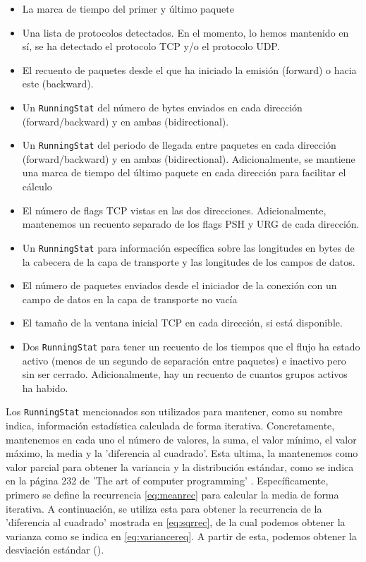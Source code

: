 \begin{itemize}
  \item La marca de tiempo del primer y último paquete
  \item Una lista de protocolos detectados. En el momento, lo hemos mantenido en sí, se ha detectado el protocolo TCP y/o el protocolo UDP.
  \item El recuento de paquetes desde el que ha iniciado la emisión (forward) o hacia este (backward).
  \item Un \texttt{RunningStat} del número de bytes enviados en cada dirección (forward/backward) y en ambas (bidirectional).
  \item Un \texttt{RunningStat} del periodo de llegada entre paquetes en cada dirección (forward/backward) y en ambas (bidirectional). Adicionalmente, se mantiene una marca de tiempo del último paquete en cada dirección para facilitar el cálculo
  \item El número de flags TCP vistas en las dos direcciones. Adicionalmente, mantenemos un recuento separado de los flags PSH y URG de cada dirección.
  \item Un \texttt{RunningStat} para información específica sobre las longitudes en bytes de la cabecera de la capa de transporte y las longitudes de los campos de datos.
  \item El número de paquetes enviados desde el iniciador de la conexión con un campo de datos en la capa de transporte no vacía
  \item El tamaño de la ventana inicial TCP en cada dirección, si está disponible.
  \item Dos \texttt{RunningStat} para tener un recuento de los tiempos que el flujo ha estado activo (menos de un segundo de separación entre paquetes) e inactivo pero sin ser cerrado. Adicionalmente, hay un recuento de cuantos grupos activos ha habido.
\end{itemize}

Los \texttt{RunningStat} mencionados son utilizados para mantener, como su nombre indica, información estadística calculada de forma iterativa. Concretamente, mantenemos en cada uno el número de valores, la suma, el valor mínimo, el valor máximo, la media y la 'diferencia al cuadrado'. Esta ultima, la mantenemos como valor parcial para obtener la variancia y la distribución estándar, como se indica en la página 232 de 'The art of computer programming' \cite{10.5555/270146}. Específicamente, primero se define la recurrencia \ref{eq:meanrec} para calcular la media de forma iterativa. A continuación, se utiliza esta para obtener la recurrencia de la 'diferencia al cuadrado' mostrada en \ref{eq:sqrrec}, de la cual podemos obtener la varianza como se indica en \ref{eq:variancereq}. A partir de esta, podemos obtener la desviación estándar (\sigma).

